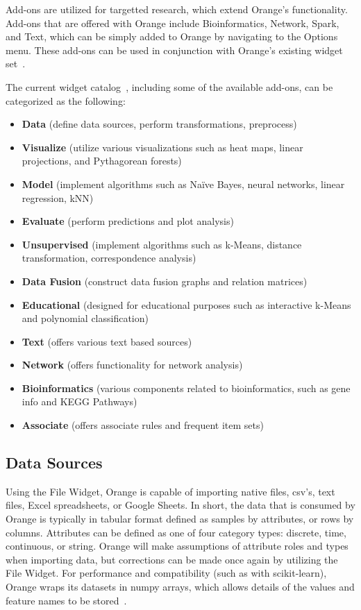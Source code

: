 Add-ons are utilized for targetted research, which extend Orange's
functionality. Add-ons that are offered with
Orange include Bioinformatics,
Network, Spark, and Text, which can be simply added to Orange by
navigating to the Options menu. These add-ons can be used in conjunction
with Orange's existing widget set~\cite{hid-sp18-504-orange}.

The current widget catalog~\cite{hid-sp18-504-orange}, including some
of the available add-ons, can be categorized as the following:

\begin{itemize}

   \item {\bf Data} (define data sources, perform
   transformations, preprocess)
   \item {\bf Visualize} (utilize various visualizations such as heat maps,
   linear projections, and Pythagorean forests)
   \item {\bf Model} (implement algorithms such as Naïve Bayes, neural
   networks, linear regression, kNN)
   \item {\bf Evaluate} (perform predictions and plot analysis)
   \item {\bf Unsupervised} (implement algorithms such as k-Means, distance
   transformation, correspondence analysis)
   \item {\bf Data Fusion} (construct data fusion graphs and relation matrices)
   \item {\bf Educational} (designed for educational purposes such as
   interactive k-Means and polynomial classification)
   \item {\bf Text} (offers various text based sources)
   \item {\bf Network} (offers functionality for network analysis)
   \item {\bf Bioinformatics} (various components related to bioinformatics,
   such as gene info and KEGG Pathways)
   \item {\bf Associate} (offers associate rules and frequent item sets)

\end{itemize}

\subsection{Data Sources}
Using the File Widget, Orange is capable of importing native files,
csv’s, text files, Excel spreadsheets, or Google Sheets.
In short, the data that
is consumed by Orange is typically in tabular format defined as samples
by attributes, or rows by columns. Attributes can be defined as one of
four category types: discrete, time, continuous, or string. Orange will
make assumptions of attribute roles and types when importing data, but
corrections can be made once again by utilizing the File Widget.
For performance and compatibility (such as with scikit-learn),
Orange wraps its datasets in numpy arrays, which allows details of
the values and feature names to be stored~\cite{hid-sp18-504-orange}.

